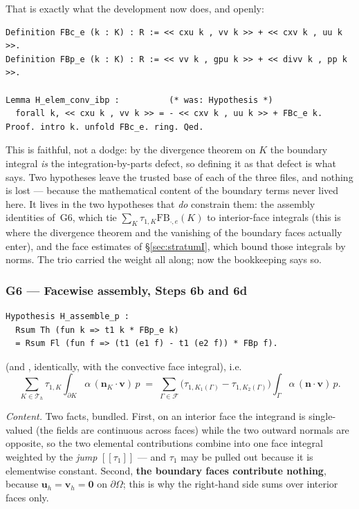 \documentclass[11pt]{article}
\newcommand{\coq}[1]{\texttt{\detokenize{#1}}}
\newcommand{\lbl}[1]{\texttt{\detokenize{#1}}}
\newcommand{\Th}{\mathcal{T}_h}          %
\begin{document}
That is exactly what the development now does, and openly:
\begin{lstlisting}
Definition FBc_e (k : K) : R := << cxu k , vv k >> + << cxv k , uu k >>.
Definition FBp_e (k : K) : R := << vv k , gpu k >> + << divv k , pp k >>.

Lemma H_elem_conv_ibp :          (* was: Hypothesis *)
  forall k, << cxu k , vv k >> = - << cxv k , uu k >> + FBc_e k.
Proof. intro k. unfold FBc_e. ring. Qed.
\end{lstlisting}
This is faithful, not a dodge: by the divergence theorem on $K$ the boundary
integral \emph{is} the integration-by-parts defect, so defining it as that
defect is what \lbl{eq:elemibp} says. Two hypotheses leave the trusted base of
each of the three files, and nothing is lost --- because the mathematical
content of the boundary terms never lived here. It lives in the two hypotheses
that \emph{do} constrain them: the assembly identities of~G6, which tie
$\sum_K\tau_{1,K}\mathrm{FB}_{\cdot,e}(K)$ to interior-face integrals (this is
where the divergence theorem and the vanishing of the boundary faces actually
enter), and the face estimates of \S\ref{sec:stratumI}, which bound those
integrals by norms. The trio carried the weight all along; now the bookkeeping
says so.

\subsubsection{G6 --- Facewise assembly, Steps 6b and 6d}

\begin{lstlisting}
Hypothesis H_assemble_p :
  Rsum Th (fun k => t1 k * FBp_e k)
  = Rsum Fl (fun f => (t1 (e1 f) - t1 (e2 f)) * FBp f).
\end{lstlisting}
(and \coq{H_assemble_c}, identically, with the convective face integral), i.e.
\begin{equation}\label{eq:assemble-here}
  \sum_{K\in\Th}\tau_{1,K}\int_{\partial K}\!\!\alpha\,(\mathbf n_K\!\cdot\!\mathbf v)\,p
  \;=\;
  \sum_{\Gamma\in\mathcal F}\bigl(\tau_{1,K_1(\Gamma)}-\tau_{1,K_2(\Gamma)}\bigr)
  \int_{\Gamma}\!\alpha\,(\mathbf n\!\cdot\!\mathbf v)\,p .
\end{equation}

\emph{Content.} Two facts, bundled. First, on an interior face the integrand is
single-valued (the fields are continuous across faces) while the two outward
normals are opposite, so the two elemental contributions combine into one
face integral weighted by the \emph{jump} $[\![\tau_1]\!]$ --- and $\tau_1$ may
be pulled out because it is elementwise constant. Second, \textbf{the boundary
faces contribute nothing}, because $\mathbf u_h=\mathbf v_h=\mathbf 0$ on
$\partial\Omega$; this is why the right-hand side sums over interior faces only.
\end{document}
